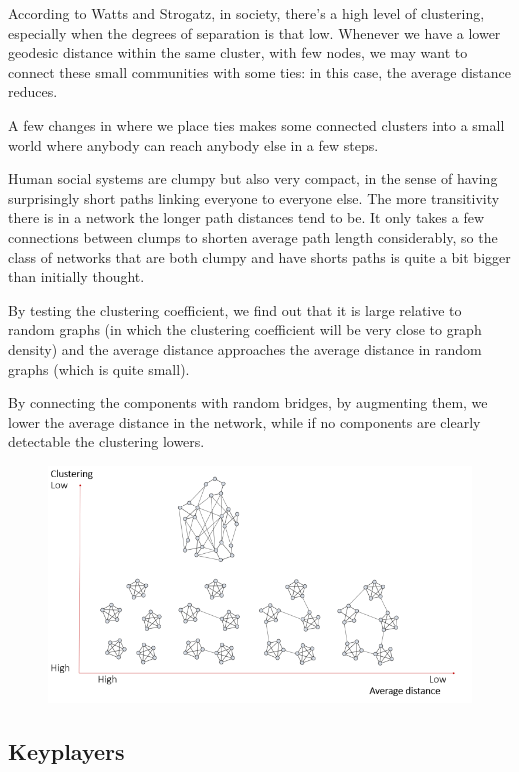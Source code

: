 \documentclass[
  notitlepage,
  onecolumn,
  openany]{book}
\begin{document}
According to Watts and Strogatz, in society, there's a high level of
clustering, especially when the degrees of separation is that low.
Whenever we have a lower geodesic distance within the same cluster, with
few nodes, we may want to connect these small communities with some
ties: in this case, the average distance reduces.

A few changes in where we place ties makes some connected clusters into
a small world where anybody can reach anybody else in a few steps.

Human social systems are clumpy but also very compact, in the sense of
having surprisingly short paths linking everyone to everyone else. The
more transitivity there is in a network the longer path distances tend
to be. It only takes a few connections between clumps to shorten average
path length considerably, so the class of networks that are both clumpy
and have shorts paths is quite a bit bigger than initially thought.

By testing the clustering coefficient, we find out that it is large
relative to random graphs (in which the clustering coefficient will be
very close to graph density) and the average distance approaches the
average distance in random graphs (which is quite small).

By connecting the components with random bridges, by augmenting them, we
lower the average distance in the network, while if no components are
clearly detectable the clustering lowers.

\begin{figure}[h!]

{\centering \includegraphics[width=0.8\linewidth]{images/07-Triads and structural holes/Untitled 4} 

}

\end{figure}

\hypertarget{keyplayers}{%
\subsection{Keyplayers}\label{keyplayers}}
\end{document}
